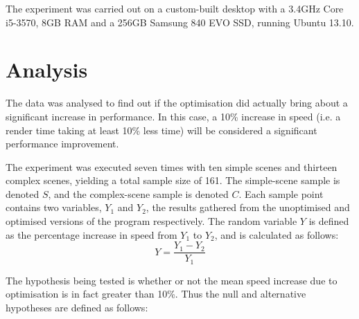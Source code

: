 \documentclass[a4paper]{article}
\begin{document}
The experiment was carried out on a custom-built desktop with a 3.4GHz Core i5-3570, 8GB RAM and a 256GB Samsung 840 EVO SSD, running Ubuntu 13.10.

\section{Analysis}
The data was analysed to find out if the optimisation did actually bring about a significant increase in performance. In this case, a 10\% increase in speed (i.e. a render time taking at least 10\% less time) will be considered a significant performance improvement.

The experiment was executed seven times with ten simple scenes and thirteen complex scenes, yielding a total sample size of 161. The simple-scene sample is denoted $S$, and the complex-scene sample is denoted $C$. Each sample point contains two variables, $Y_1$ and $Y_2$, the results gathered from the unoptimised and optimised versions of the program respectively. The random variable $Y$ is defined as the percentage increase in speed from $Y_1$ to $Y_2$, and is calculated as follows:
$$
Y = \frac{Y_1 - Y_2}{Y_1}
$$

\begin{center}
\end{center}

The hypothesis being tested is whether or not the mean speed increase due to optimisation is in fact greater than 10\%. Thus the null and alternative hypotheses are defined as follows:
\end{document}
